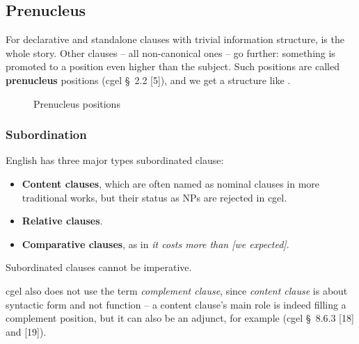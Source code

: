 \documentclass{article}
\newcommand*{\citesec}[1]{\S~{#1}}
\newcommand*{\concept}[1]{\textbf{#1}}
\newcommand*{\term}[1]{\emph{#1}}
\newcommand*{\corpus}[1]{\emph{#1}}
\begin{document}
\subsection{Prenucleus}\label{sec:prenucleus}

For declarative and standalone clauses with trivial information structure, 
 is the whole story.
Other clauses -- all non-canonical ones -- go further: 
something is promoted to a position even higher than the subject.
Such positions are called \concept{prenucleus} positions (\ac{cgel} \citesec{2.2} [5]), 
and we get a structure like .

\begin{figure}
    \centering
    
    \caption{Prenucleus positions}
    \label{fig:prenucleus}
\end{figure}

\subsubsection{Subordination}

English has three major types subordinated clause:
\begin{itemize}
    \item \concept{Content clauses}, 
    which are often named as nominal clauses in more traditional works,
    but their status as NPs are rejected in \ac{cgel}. %
    \item \concept{Relative clauses}.
    \item \concept{Comparative clauses}, as in \corpus{it costs more than [we expected]}.
\end{itemize}
Subordinated clauses cannot be imperative.

\ac{cgel} also does not use the term \term{complement clause},
since \term{content clause} is about syntactic form and not function -- 
a content clause's main role is indeed filling a complement position,
but it can also be an adjunct, for example (\ac{cgel} \citesec{8.6.3} [18] and [19]).
\end{document}

